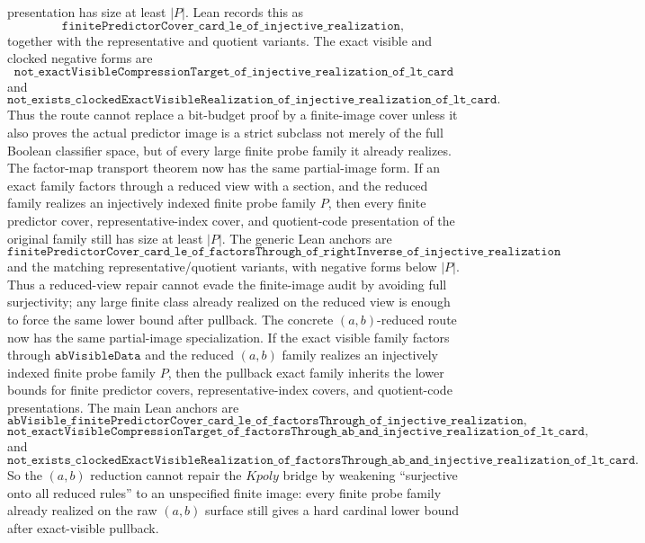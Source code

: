 \documentclass[11pt]{article}
\theoremstyle{remark}
\begin{document}
presentation has size at least \(|P|\).  Lean records this as
\[
  \texttt{finitePredictorCover\_card\_le\_of\_injective\_realization},
\]
together with the representative and quotient variants.  The exact visible and
clocked negative forms are
\[
  \texttt{not\_exactVisibleCompressionTarget\_of\_injective\_realization\_of\_lt\_card}
\]
and
\[
  \texttt{not\_exists\_clockedExactVisibleRealization\_of\_injective\_realization\_of\_lt\_card}.
\]
Thus the route cannot replace a bit-budget proof by a finite-image cover unless
it also proves the actual predictor image is a strict subclass not merely of the
full Boolean classifier space, but of every large finite probe family it
already realizes.
The factor-map transport theorem now has the same partial-image form.  If an
exact family factors through a reduced view with a section, and the reduced
family realizes an injectively indexed finite probe family \(P\), then every
finite predictor cover, representative-index cover, and quotient-code
presentation of the original family still has size at least \(|P|\).  The
generic Lean anchors are
\[
  \texttt{finitePredictorCover\_card\_le\_of\_factorsThrough\_of\_rightInverse\_of\_injective\_realization}
\]
and the matching representative/quotient variants, with negative forms below
\(|P|\).  Thus a reduced-view repair cannot evade the finite-image audit by
avoiding full surjectivity; any large finite class already realized on the
reduced view is enough to force the same lower bound after pullback.
The concrete \((a,b)\)-reduced route now has the same partial-image
specialization.  If the exact visible family factors through
\(\texttt{abVisibleData}\) and the reduced \((a,b)\) family realizes an
injectively indexed finite probe family \(P\), then the pullback exact family
inherits the lower bounds for finite predictor covers, representative-index
covers, and quotient-code presentations.  The main Lean anchors are
\[
  \texttt{abVisible\_finitePredictorCover\_card\_le\_of\_factorsThrough\_of\_injective\_realization},
\]
\[
  \texttt{not\_exactVisibleCompressionTarget\_of\_factorsThrough\_ab\_and\_injective\_realization\_of\_lt\_card},
\]
and
\[
  \texttt{not\_exists\_clockedExactVisibleRealization\_of\_factorsThrough\_ab\_and\_injective\_realization\_of\_lt\_card}.
\]
So the \((a,b)\) reduction cannot repair the \(Kpoly\) bridge by weakening
``surjective onto all reduced rules'' to an unspecified finite image: every
finite probe family already realized on the raw \((a,b)\) surface still gives
a hard cardinal lower bound after exact-visible pullback.
\end{document}
